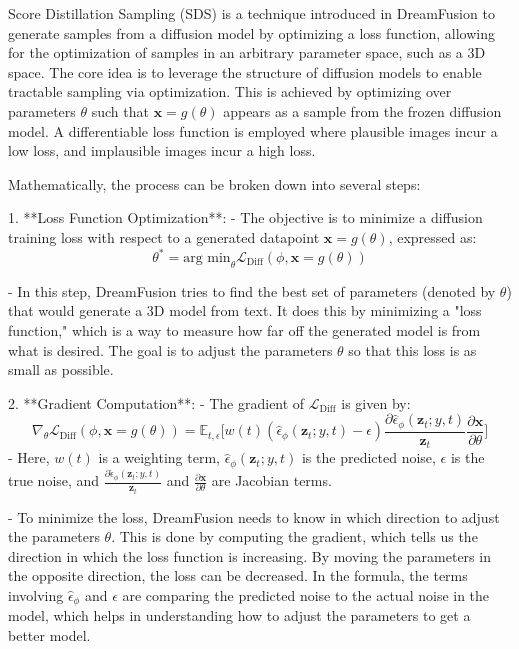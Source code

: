 Score Distillation Sampling (SDS) is a technique introduced in DreamFusion to generate samples from a diffusion model by optimizing a loss function, allowing for the optimization of samples in an arbitrary parameter space, such as a 3D space. The core idea is to leverage the structure of diffusion models to enable tractable sampling via optimization. This is achieved by optimizing over parameters \( \theta \) such that \( \mathbf{x} = g(\theta) \) appears as a sample from the frozen diffusion model. A differentiable loss function is employed where plausible images incur a low loss, and implausible images incur a high loss.

Mathematically, the process can be broken down into several steps:

1. **Loss Function Optimization**:
    - The objective is to minimize a diffusion training loss with respect to a generated datapoint \( \mathbf{x} = g(\theta) \), expressed as:
     \[ \theta^{*} = \text{arg min}_{\theta} \mathcal{L}_{\text{Diff}}(\phi, \mathbf{x} = g(\theta)) \]
   
    - In this step, DreamFusion tries to find the best set of parameters (denoted by \( \theta \)) that would generate a 3D model from text. It does this by minimizing a "loss function," which is a way to measure how far off the generated model is from what is desired. The goal is to adjust the parameters \( \theta \) so that this loss is as small as possible.

2. **Gradient Computation**:
   - The gradient of \( \mathcal{L}_{\text{Diff}} \) is given by:
     \[ \nabla_{\theta}\mathcal{L}_{\text{Diff}}(\phi,\mathbf{x}=g(\theta))=\mathbb{E}_{t,\epsilon}\Bigg[w(t)\left(\hat{\epsilon}_{\phi}({\mathbf{z}}_{t};y,t)-\epsilon\right)\frac{\partial\hat{\epsilon}_{\phi}({\mathbf{z}}_{t};y,t)}{\mathbf{z}_t}\frac{\partial\mathbf{x}}{\partial\theta}\Bigg] \]
   - Here, \( w(t) \) is a weighting term, \( \hat{\epsilon}_{\phi}({\mathbf{z}}_{t};y,t) \) is the predicted noise, \( \epsilon \) is the true noise, and \( \frac{\partial\hat{\epsilon}_{\phi}({\mathbf{z}}_{t};y,t)}{\mathbf{z}_t} \) and \( \frac{\partial\mathbf{x}}{\partial\theta} \) are Jacobian terms. 

   - To minimize the loss, DreamFusion needs to know in which direction to adjust the parameters \( \theta \). This is done by computing the gradient, which tells us the direction in which the loss function is increasing. By moving the parameters in the opposite direction, the loss can be decreased. In the formula, the terms involving \( \hat{\epsilon}_{\phi} \) and \( \epsilon \) are comparing the predicted noise to the actual noise in the model, which helps in understanding how to adjust the parameters to get a better model.

